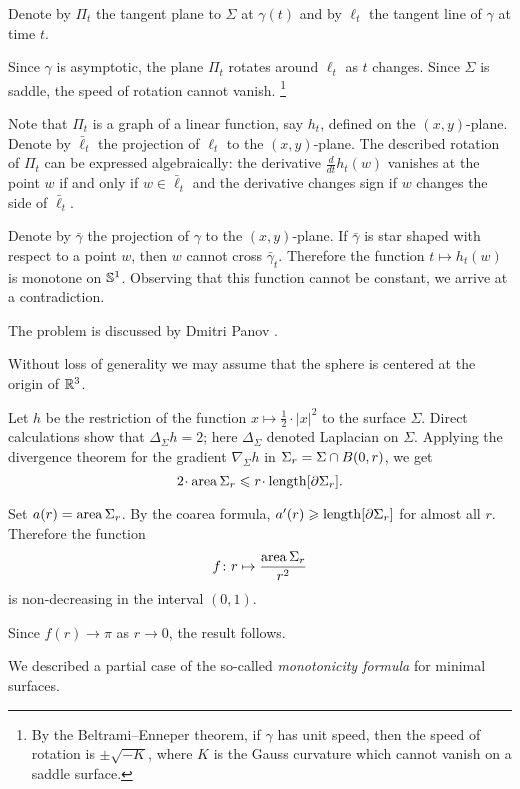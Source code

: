 Denote by $\Pi_t$ the tangent plane to $\Sigma$ at $\gamma(t)$ and by $\ell_t$ the tangent line of $\gamma$ at time $t$.

Since $\gamma$ is asymptotic, the plane $\Pi_t$ rotates around $\ell_t$ as $t$ changes.
Since $\Sigma$ is saddle, the speed of rotation cannot vanish.%
\footnote{By the Beltrami--Enneper theorem, if $\gamma$ has unit speed, then the speed of rotation is $\pm\sqrt{-K}$, where $K$ is the Gauss curvature which cannot vanish on a saddle surface.}

Note that $\Pi_t$ is a graph of a linear function, say $h_t$, defined on the $(x, y)$-plane.
Denote by $\bar\ell_t$ the projection of $\ell_t$ to the $(x, y)$-plane.
The described rotation of $\Pi_t$ can be expressed algebraically:
the derivative $\tfrac{d}{dt}h_t(w)$ vanishes at the point $w$ if and only if $w\in \bar\ell_t$ 
and the derivative changes sign if $w$ changes the side of $\bar\ell_t$.

Denote by $\bar\gamma$ the projection of $\gamma$ to the $(x, y)$-plane.
If $\bar\gamma$ is star shaped with respect to a point $w$, then $w$ cannot cross $\bar\gamma_t$.
Therefore the function $t\mapsto h_t(w)$ is monotone on $\mathbb{S}^1$.
Observing that this function cannot be constant, we arrive at a contradiction.\qeds

The problem is discussed by Dmitri Panov \cite{panov-curves}.

Without loss of generality we may assume that the sphere is centered at the origin of $\mathbb{R}^3$.

Let $h$ be the restriction of the function $x\mapsto \tfrac12\cdot|x|^2$ to the surface $\Sigma$.
Direct calculations show that $\Delta_\Sigma h =  2$;
here $\Delta_\Sigma$ denoted Laplacian on $\Sigma$.
Applying the divergence theorem for the gradient $\nabla_\Sigma h$
in $\Sigma_r\z=\Sigma\cap B(0,r)$, we get
\[2\cdot \area\Sigma_r\le r\cdot\length [\partial\Sigma_r].\]

Set $a(r)=\operatorname{\rm area}\nolimits\Sigma_r$.
By the coarea formula, $a'(r)\geqslant\operatorname{\rm length} [\partial\Sigma_r]$ for almost all $r$.
Therefore the function
\[f\colon r\mapsto \frac{\operatorname{\rm area}\nolimits\Sigma_r}{r^2}
\]
is non-decreasing in the interval $(0,1)$.

Since $f(r)\to \pi$ as $r\to0$, the result follows.\qeds

We described a partial case of the so-called \emph{monotonicity formula} for minimal surfaces.

